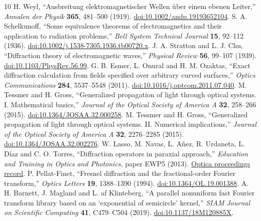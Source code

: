 \documentclass[11pt,a4paper]{article}
\numberwithin{equation}{section}
\begin{document}
\begin{thebibliography}{10}
 H. Weyl, ``Ausbreitung elektromagnetischer Wellen über einem ebenen Leiter,''
 \emph{Annalen der Physik} \textbf{365}, 481--500 (1919).
 \href{https://doi.org/10.1002/andp.19193652104}{doi:10.1002/andp.19193652104}.
 S. A. Schelkunoff, ``Some equivalence theorems of electromagnetics and their
 application to radiation problems,'' \emph{Bell System Technical Journal}
 \textbf{15}, 92--112 (1936).
 \href{https://doi.org/10.1002/j.1538-7305.1936.tb00720.x}{doi:10.1002/j.1538-7305.1936.tb00720.x}.
 J. A. Stratton and L. J. Chu, ``Diffraction theory of electromagnetic waves,''
 \emph{Physical Review} \textbf{56}, 99--107 (1939).
 \href{https://doi.org/10.1103/PhysRev.56.99}{doi:10.1103/PhysRev.56.99}.
 G. B. Esmer, L. Onural and H. M. Ozaktas, ``Exact diffraction calculation from
 fields specified over arbitrary curved surfaces,'' \emph{Optics
 Communications} \textbf{284}, 5537--5548 (2011).
 \href{https://doi.org/10.1016/j.optcom.2011.07.040}{doi:10.1016/j.optcom.2011.07.040}.
 M. Tessmer and H. Gross, ``Generalized propagation of light through optical
 systems. I. Mathematical basics,'' \emph{Journal of the Optical Society of
 America A} \textbf{32}, 258--266 (2015).
 \href{https://doi.org/10.1364/JOSAA.32.000258}{doi:10.1364/JOSAA.32.000258}.
 M. Tessmer and H. Gross, ``Generalized propagation of light through optical
 systems. II. Numerical implications,'' \emph{Journal of the Optical Society
 of America A} \textbf{32}, 2276--2285 (2015).
 \href{https://doi.org/10.1364/JOSAA.32.002276}{doi:10.1364/JOSAA.32.002276}.
 W. Lasso, M. Navas, L. A\~nez, R. Urdaneta, L. D\'iaz and C. O. Torres,
 ``Diffraction operators in paraxial approach,'' \emph{Education and Training
 in Optics and Photonics}, paper EWP5 (2013).
 \href{https://opg.optica.org/abstract.cfm?uri=etop-2013-EWP5}{Optica proceedings record}.
 P. Pellat-Finet, ``Fresnel diffraction and the fractional-order Fourier
 transform,'' \emph{Optics Letters} \textbf{19}, 1388--1390 (1994).
 \href{https://doi.org/10.1364/OL.19.001388}{doi:10.1364/OL.19.001388}.
 A. H. Barnett, J. Magland and L. af Klinteberg, ``A parallel nonuniform fast
 Fourier transform library based on an `exponential of semicircle' kernel,''
 \emph{SIAM Journal on Scientific Computing} \textbf{41}, C479--C504 (2019).
 \href{https://doi.org/10.1137/18M120885X}{doi:10.1137/18M120885X}.
\end{thebibliography}
\end{document}
